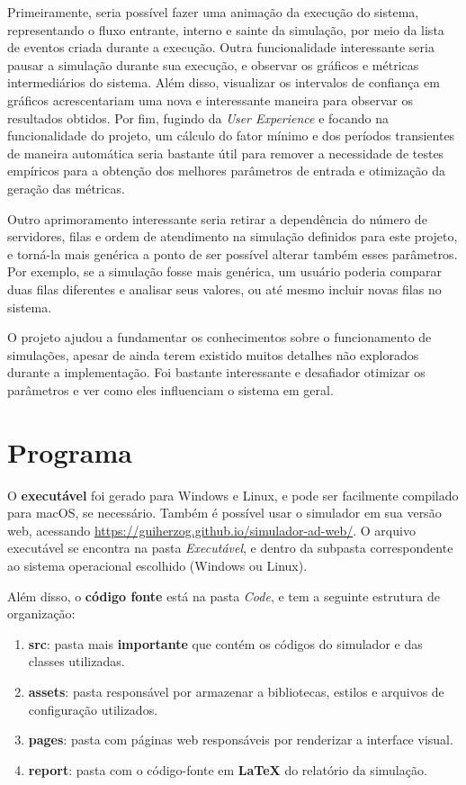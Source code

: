 \documentclass[a4paper,12pt]{report}
\begin{document}
Primeiramente, seria possível fazer uma animação da execução do sistema, representando o fluxo entrante, interno e sainte da simulação, por meio da lista de eventos criada durante a execução. Outra funcionalidade interessante seria pausar a simulação durante sua execução, e observar os gráficos e métricas intermediários do sistema. Além disso, visualizar os intervalos de confiança em gráficos acrescentariam uma nova e interessante maneira para observar os resultados obtidos. Por fim, fugindo da \emph{User Experience} e focando na funcionalidade do projeto, um cálculo do fator mínimo e dos períodos transientes de maneira automática seria bastante útil para remover a necessidade de testes empíricos para a obtenção dos melhores parâmetros de entrada e otimização da geração das métricas.

Outro aprimoramento interessante seria retirar a dependência do número de servidores, filas e ordem de atendimento na simulação definidos para este projeto, e torná-la mais genérica a ponto de ser possível alterar também esses parâmetros. Por exemplo, se a simulação fosse mais genérica, um usuário poderia comparar duas filas diferentes e analisar seus valores, ou até mesmo incluir novas filas no sistema.

O projeto ajudou a fundamentar os conhecimentos sobre o funcionamento de simulações, apesar de ainda terem existido muitos detalhes não explorados durante a implementação. Foi bastante interessante e desafiador otimizar os parâmetros e ver como eles influenciam o sistema em geral.

\appendix
\chapter{Programa}

O \textbf{executável} foi gerado para Windows e Linux, e pode ser facilmente compilado para macOS, se necessário. Também é possível usar o simulador em sua versão web, acessando \url{https://guiherzog.github.io/simulador-ad-web/}. O arquivo executável se encontra na pasta \emph{Executável}, e dentro da subpasta correspondente ao sistema operacional escolhido (Windows ou Linux).

Além disso, o \textbf{código fonte} está na pasta \emph{Code}, e tem a seguinte estrutura de organização:

\vspace{-5mm}
\begin{enumerate}
	\itemsep0.5em
	\item \textbf{src}: pasta mais \textbf{importante} que contém os códigos do simulador e das classes utilizadas.
	\item \textbf{assets}: pasta responsável por armazenar a bibliotecas, estilos e arquivos de configuração utilizados.
	\item \textbf{pages}: pasta com páginas web responsáveis por renderizar a interface visual.
	\item \textbf{report}: pasta com o código-fonte em \textbf{LaTeX} do relatório da simulação.
\end{enumerate}
\end{document}
